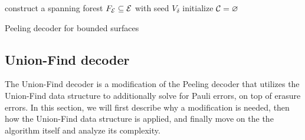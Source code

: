 \begin{algorithm}[h]
  \BlankLine
  \BlankLine
  construct a spanning forest $F_{\mathcal{E}}\subseteq\mathcal{E}$ with seed $V_\delta$\;
  initialize $\mathcal{C} = {\varnothing}$\;
  \BlankLine
  \caption{Peeling decoder for bounded surfaces \cite{delfosse2017linear}}\label{algo:peelbound}
\end{algorithm}






\subsection{Union-Find decoder}
The Union-Find decoder \cite{delfosse2017almost} is a modification of the Peeling decoder that utilizes the Union-Find data structure \cite{tarjan1975efficiency} to additionally solve for Pauli errors, on top of erasure errors. In this section, we will first describe why a modification is needed, then how the Union-Find data structure is applied, and finally move on the the algorithm itself and analyze its complexity.

